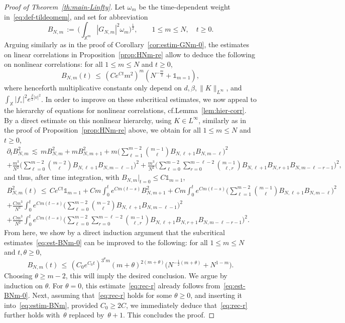 \documentclass[a4paper,11pt,reqno,noindent]{amsart}
\theoremstyle{plain}
\theoremstyle{definition}
\numberwithin{equation}{section}
\newcommand{\Xd}{\mathbb X}
\begin{document}
\begin{proof}[Proof of Theorem~\ref{th:main-Linfty}]
Let $\omega_m$ be the time-dependent weight in~\eqref{eq:def-tildeomem}, and set for abbreviation
\[B_{N,m}\,:=\,\Big(\int_{\Xd^m}|G_{N,m}|^2\omega_m\Big)^\frac12,\qquad1\le m\le N,\quad t\ge0.\]
Arguing similarly as in the proof of Corollary~\ref{cor:estim-GNm-0}, the estimates on linear correlations in Proposition~\ref{prop:HNm-re} allow to deduce the following on nonlinear correlations: for all $1\le m\le N$ and $t\ge0$,
\begin{equation}\label{eq:est-BNm-0}
B_{N,m}(t)\,\le\,(Ce^{Ct}m^2)^m(N^{-\frac m2}+\mathds1_{m=1}),
\end{equation}
where henceforth multiplicative constants only depend on $d,\beta,\|K\|_{L^\infty}$, and $\int_\Xd|f_\circ|^2e^{\frac\beta2|v|^2}$.
In order to improve on these subcritical estimates, we now appeal to the hierarchy of equations for nonlinear correlations, cf.\@ Lemma~\ref{lem:hier-corr}.
By a direct estimate on this nonlinear hierarchy, using $K\in L^\infty$, similarly as in the proof of Proposition~\ref{prop:HNm-re} above, we obtain for all $1\le m\le N$ and $t\ge0$,
\begin{multline*}
\partial_t B_{N,m}^2\,\lesssim\, mB_{N,m}^2
+mB_{N,m+1}^2
+m\bigg(\sum_{\ell=1}^{m-2}\binom{m-1}{\ell}B_{N,\ell+1} B_{N,m-\ell}\bigg)^2\\
+ \frac{m^3}{N^2}\bigg( \sum_{\ell=0}^{m-2}\binom{m-2}{\ell} B_{N,\ell+1}B_{N,m-\ell-1}\bigg)^2
+\frac{m^3}{N^2} \bigg(\sum_{\ell=0}^{m-2}\sum_{r=0}^{m-\ell-2}\binom{m-1}{\ell,r} B_{N,\ell+1} B_{N,r+1} B_{N,m-\ell-r-1} \bigg)^2,
\end{multline*}
and thus, after time integration, with $B_{N,m}|_{t=0}\le C\mathds1_{m=1}$,
\begin{multline}\label{eq:estim-BNm}
B_{N,m}^2(t)\,\le\,Ce^{Ct}\mathds1_{m=1}
+Cm\int_0^te^{Cm(t-s)}B_{N,m+1}^2
+Cm\int_0^te^{Cm(t-s)}\bigg(\sum_{\ell=1}^{m-2}\binom{m-1}{\ell}B_{N,\ell+1} B_{N,m-\ell}\bigg)^2\\
+\frac{Cm^3}{N^2}\int_0^te^{Cm(t-s)}\bigg( \sum_{\ell=0}^{m-2}\binom{m-2}{\ell} B_{N,\ell+1}B_{N,m-\ell-1}\bigg)^2\\
+\frac{Cm^3}{N^2}\int_0^te^{Cm(t-s)}\bigg(\sum_{\ell=0}^{m-2}\sum_{r=0}^{m-\ell-2}\binom{m-1}{\ell,r} B_{N,\ell+1} B_{N,r+1} B_{N,m-\ell-r-1} \bigg)^2.
\end{multline}
From here, we show by a direct induction argument that the subcritical estimates~\eqref{eq:est-BNm-0} can be improved to the following: for all $1\le m\le N$ and $t,\theta\ge0$,
\begin{equation}\label{eq:rec-r}
B_{N,m}(t)\,\le\,(C_0e^{C_0t})^{3^\theta m}(m+\theta)^{2(m+\theta)}\big(N^{-\frac12(m+\theta)}+N^{1-m}\big).
\end{equation}
Choosing $\theta\ge m-2$, this will imply the desired conclusion.
We argue by induction on $\theta$. For $\theta=0$, this estimate~\eqref{eq:rec-r} already follows from~\eqref{eq:est-BNm-0}. Next, assuming that~\eqref{eq:rec-r} holds for some $\theta\ge0$, and inserting it into~\eqref{eq:estim-BNm}, provided $C_0\ge2C$, we immediately deduce that~\eqref{eq:rec-r} further holds with~$\theta$ replaced by~$\theta+1$. This concludes the proof.
\end{proof}
\end{document}
